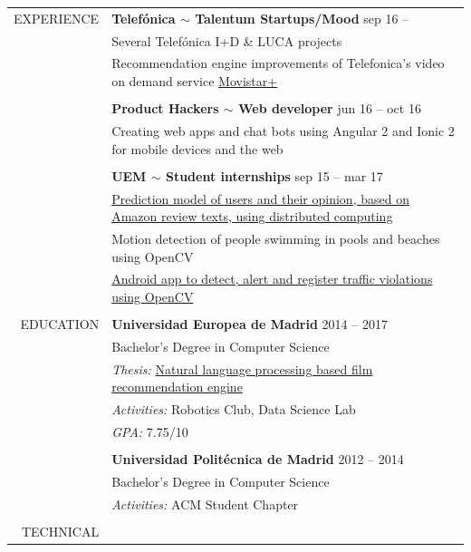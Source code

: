 \documentclass[a4paper, 11pt]{article}
\begin{document}
\begin{longtable}{r|p{12cm}}
    EXPERIENCE
    & \textbf{Telefónica $\sim$ Talentum Startups/Mood} \hfill sep 16 --
    \\
    & Several Telefónica I+D \& LUCA projects
    \\
    & Recommendation engine improvements of Telefonica's video on demand service \href{http://ver.movistarplus.es/}{Movistar+}
    \\\\
    & \textbf{Product Hackers $\sim$ Web developer} \hfill jun 16 -- oct 16
    \\
    & Creating web apps and chat bots using Angular 2 and Ionic 2 for mobile devices and the web
    \\\\
    & \textbf{UEM $\sim$ Student internships} \hfill sep 15 -- mar 17
    \\
    & \href{https://www.researchgate.net/publication/314142014_Prediction_of_User_Opinion_for_Products_-_A_Bag-of-Words_and_Collaborative_Filtering_based_Approach}{Prediction model of users and their opinion, based on Amazon review texts, using distributed computing}
    \\
    & Motion detection of people swimming in pools and beaches using OpenCV
    \\
    & \href{https://github.com/hugo19941994/infrac-coche}{Android app to detect, alert and register traffic violations using OpenCV}
    \\\\
    EDUCATION
    & \textbf{Universidad Europea de Madrid} \hfill 2014 -- 2017
    \\
    & Bachelor's Degree in Computer Science
    \\
    & \textit{Thesis:} \href{https://github.com/hugo19941994/movie-pepper-doc/raw/master/thesis.pdf}{Natural language processing based film recommendation engine}
    \\
    & \textit{Activities:} Robotics Club, Data Science Lab
    \\
    & \textit{GPA:} 7.75/10
    \\\\
    & \textbf{Universidad Politécnica de Madrid} \hfill 2012 -- 2014
    \\
    & Bachelor's Degree in Computer Science
    \\
    & \textit{Activities:} ACM Student Chapter
    \\\\
    TECHNICAL

\end{longtable}
\end{document}
